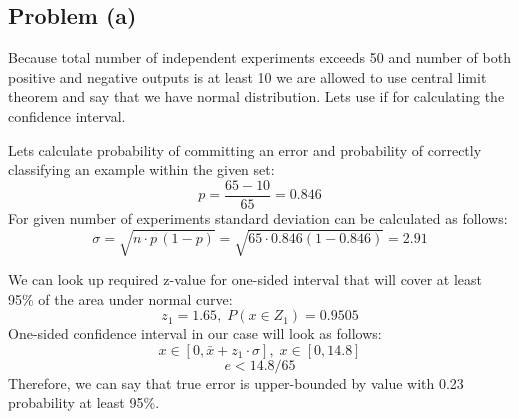 \subsection*{Problem (a)}

Because total number of independent experiments exceeds 50 and number of both positive and negative outputs is at least 10 we are allowed to use central limit theorem and say that we have normal distribution. Lets use if for calculating the confidence interval.

Lets calculate probability of committing an error and probability of correctly classifying an example within the given set:
\[
p=\frac{65-10}{65}=0.846
\]
For given number of experiments standard deviation can be calculated as follows:
 \[
\sigma=\sqrt{n\cdot p\,(1-p)}=\sqrt{65\cdot 0.846(1-0.846)}=2.91
\]

We can look up required z-value for one-sided interval that will cover at least 95\% of the area under normal curve:
 \[
z_1=1.65,\; P(x\in Z_1)=0.9505
\]
One-sided confidence interval in our case will look as follows:
 \[
x\in [0, \bar{x}+z_1\cdot\sigma],\;
x\in [0, 14.8]
\]
 \[
e < 14.8/65
\]
Therefore, we can say that true error is upper-bounded by value  with 0.23 probability at least 95\%.
